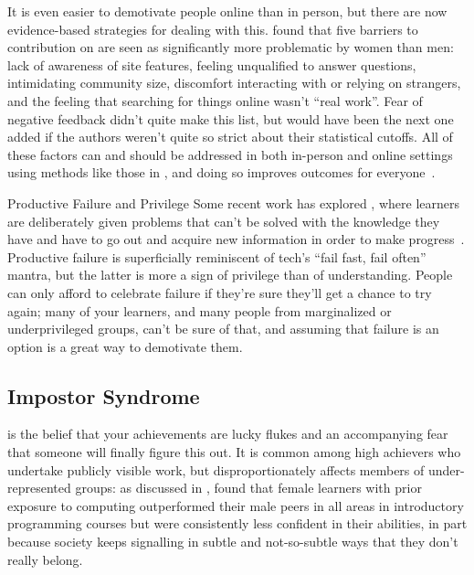 It is even easier to demotivate people online than in person,
but there are now evidence-based strategies for dealing with this.
\cite{Ford2016} found that five barriers to contribution on 
are seen as significantly more problematic by women than men:
lack of awareness of site features,
feeling unqualified to answer questions,
intimidating community size,
discomfort interacting with or relying on strangers,
and the feeling that searching for things online wasn't ``real work''.
Fear of negative feedback didn't quite make this list,
but would have been the next one added if the authors weren't quite so strict about their statistical cutoffs.
All of these factors can and should be addressed in both in-person and online settings
using methods like those in ,
and doing so improves outcomes for everyone~\cite{Sved2016}.

\begin{aside}{Productive Failure and Privilege}
  Some recent work has explored ,
  where learners are deliberately given problems that can't be solved with the knowledge they have
  and have to go out and acquire new information in order to make progress~\cite{Kapu2016}.
  Productive failure is superficially reminiscent of tech's ``fail fast, fail often'' mantra,
  but the latter is more a sign of privilege than of understanding.
  People can only afford to celebrate failure if they're sure they'll get a chance to try again;
  many of your learners,
  and many people from marginalized or underprivileged groups,
  can't be sure of that,
  and assuming that failure is an option is a great way to demotivate them.
\end{aside}

\subsection*{Impostor Syndrome}

 is the belief that
your achievements are lucky flukes
and an accompanying fear that someone will finally figure this out.
It is common among high achievers who undertake publicly visible work,
but disproportionately affects members of under-represented groups:
as discussed in ,
\cite{Wilc2018} found that
female learners with prior exposure to computing outperformed their male peers in all areas in introductory programming courses
but were consistently less confident in their abilities,
in part because society keeps signalling in subtle and not-so-subtle ways
that they don't really belong.

